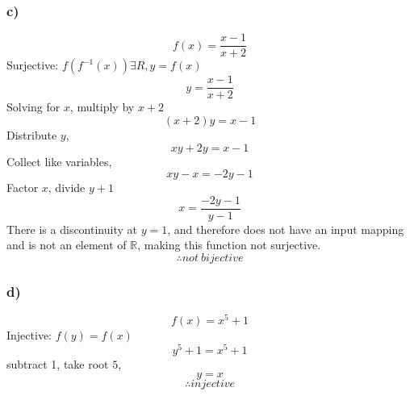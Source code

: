 \documentclass[journal]{IEEEtran}
\begin{document}
    \subsubsection*{c)}
        \begin{equation}
            f(x) = \frac{x-1}{x+2}
        \end{equation}
        Surjective: $f(f^{-1}(x)) \exists R, y = f(x)$
        \begin{equation}
            y = \frac{x-1}{x+2}
        \end{equation}
        Solving for $x$, multiply by $x+2$
        \begin{equation}
            (x+2)y = x-1
        \end{equation}
        Distribute $y$,
        \begin{equation}
            xy+2y = x-1
        \end{equation}
        Collect like variables,
        \begin{equation}
            xy-x = -2y-1
        \end{equation}
        Factor $x$, divide $y+1$
        \begin{equation}
            x = \frac{-2y-1}{y-1}
        \end{equation}
        There is a discontinuity at $y = 1$, and therefore does not have an input mapping
        and is not an element of $\mathbb{R}$, making this function not surjective.
        $$\boxed{\therefore not~bijective}$$


    \subsubsection*{d)}
        \begin{equation}
            f(x) = x^5 + 1
        \end{equation}
        Injective: $f(y) = f(x)$
        \begin{equation}
            y^5 + 1 = x^5 + 1
        \end{equation}
        subtract 1, take root $5$,
        \begin{equation}
            y = x
        \end{equation}
        $$\therefore injective$$
        
\end{document}
